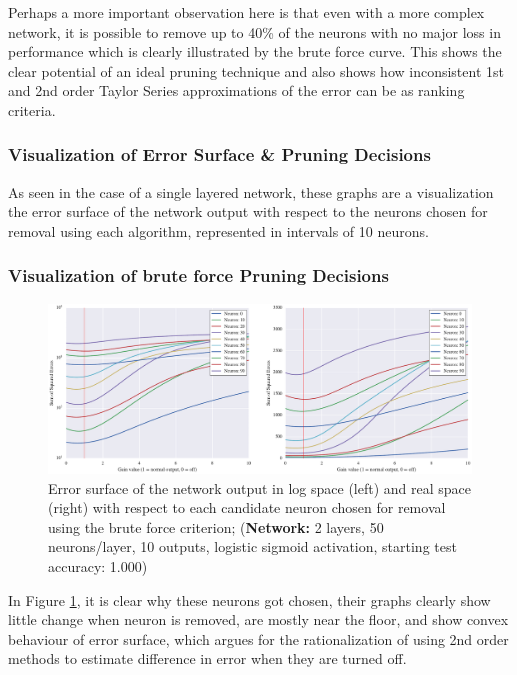 Perhaps a more important observation here is that even with a more complex network, it is possible to remove up to 40\% of the neurons with no major loss in performance which is clearly illustrated by the brute force curve. This shows the clear potential of an ideal pruning technique and also shows how inconsistent 1st and 2nd order Taylor Series approximations of the error can be as ranking criteria.

\subsubsection{Visualization of Error Surface \& Pruning Decisions}
As seen in the case of a single layered network, these graphs are a visualization the error surface of the network output with respect to the neurons chosen for removal using each algorithm, represented in intervals of 10 neurons. 

\subsubsection{Visualization of brute force Pruning Decisions}
\begin{figure}[!ht]
\centering
\includegraphics[width=\linewidth]{png/mnist-deep-gt-gain.pdf}
\caption{Error surface of the network output in log space (left) and real space (right) with respect to each candidate neuron chosen for removal using the brute force criterion; (\textbf{Network:} 2 layers, 50 neurons/layer, 10 outputs, logistic sigmoid activation, starting test accuracy: 1.000)}
\label{fig:mnist-gt-double-layer}
\end{figure}

In Figure \ref{fig:mnist-gt-double-layer}, it is clear why these neurons got chosen, their graphs clearly show little change when neuron is removed, are mostly near the floor, and show convex behaviour of error surface, which argues for the rationalization of using 2nd order methods to estimate difference in error when they are turned off.

